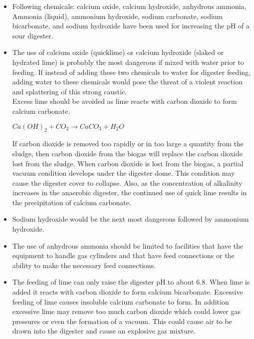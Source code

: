                             \begin{itemize}
                                \item Following chemicals: calcium oxide, calcium hydroxide, anhydrous ammonia, Ammonia (liquid), ammonium hydroxide, sodium carbonate, sodium bicarbonate, and sodium hydroxide have been used for increasing the pH of a sour digester.
                                \item The use of calcium oxide (quicklime) or calcium hydroxide (slaked or hydrated lime) is probably the most dangerous if mixed with water prior to feeding.   If instead of adding these two chemicals to water for digester feeding, adding water to these chemicals would pose the threat of a violent reaction and splattering of this strong caustic.\\ 

                                Excess lime should be avoided as lime reacts with carbon dioxide to form calcium carbonate.

                                $Ca(OH)_2 + CO_2 \rightarrow CaCO_3 + H_2O$ 

                                If carbon dioxide is removed too rapidly or in too large a quantity from the sludge, then carbon dioxide from the biogas will replace the carbon dioxide lost from the sludge. When carbon dioxide is lost from the biogas, a partial vacuum condition develops under the digester dome. This condition may cause the digester cover to collapse. Also, as the concentration of alkalinity increases in the anaerobic digester, the continued use of quick lime results in the precipitation of calcium carbonate.

                                \item Sodium hydroxide would be the next most dangerous followed by ammonium hydroxide.  
                                \item The use of anhydrous ammonia should be limited to facilities that have the equipment to handle gas cylinders and that have feed connections or the ability to make the necessary feed connections.
                                \item The feeding of lime can only raise the digester pH to about 6.8. When lime is added it reacts with carbon dioxide to form calcium bicarbonate. Excessive feeding of lime causes insoluble calcium carbonate to form. In addition excessive lime may remove too much carbon dioxide which could lower gas pressures or even the formation of a vacuum. This could cause air to be drawn into the digester and cause an explosive gas mixture.
                            \end{itemize}
                

